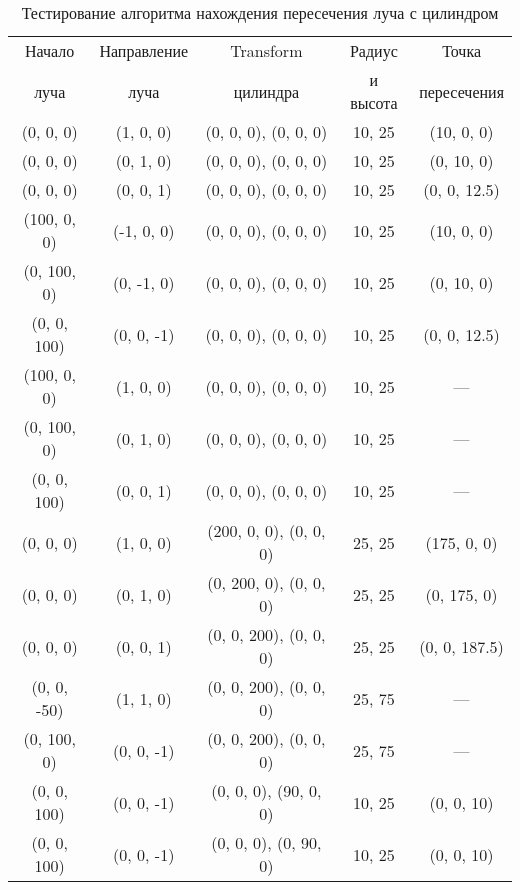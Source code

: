 \begin{table}[h]
	\begin{center}
		\begin{threeparttable}
			\captionsetup{justification=raggedright,singlelinecheck=off}
			\caption{Тестирование алгоритма нахождения пересечения луча с цилиндром}
			\label{tbl:test_cyl_hit}
			\begin{tabular}{|c|c|c|c|c|}
				\hline
				Начало  & Направление  & Transform  & Радиус & Точка \\
				луча &  луча &  цилиндра & и высота & пересечения \\
				\hline
				(0, 0, 0) & (1, 0, 0) & (0, 0, 0), (0, 0, 0) & 10, 25 & (10, 0, 0) \\
				\hline
				(0, 0, 0) & (0, 1, 0) & (0, 0, 0), (0, 0, 0) & 10, 25 & (0, 10, 0) \\
				\hline
				(0, 0, 0) & (0, 0, 1) & (0, 0, 0), (0, 0, 0) & 10, 25 & (0, 0, 12.5) \\
				\hline
				(100, 0, 0) & (-1, 0, 0) & (0, 0, 0), (0, 0, 0) & 10, 25 & (10, 0, 0) \\
				\hline
				(0, 100, 0) & (0, -1, 0) & (0, 0, 0), (0, 0, 0) & 10, 25 & (0, 10, 0) \\
				\hline
				(0, 0, 100) & (0, 0, -1) & (0, 0, 0), (0, 0, 0) & 10, 25 & (0, 0, 12.5) \\
				\hline
				(100, 0, 0) & (1, 0, 0) & (0, 0, 0), (0, 0, 0) & 10, 25 & --- \\
				\hline
				(0, 100, 0) & (0, 1, 0) & (0, 0, 0), (0, 0, 0) & 10, 25 & --- \\
				\hline
				(0, 0, 100) & (0, 0, 1) & (0, 0, 0), (0, 0, 0) & 10, 25 & --- \\
				\hline
				(0, 0, 0) & (1, 0, 0) & (200, 0, 0), (0, 0, 0) & 25, 25 & (175, 0, 0) \\
				\hline
				(0, 0, 0) & (0, 1, 0) & (0, 200, 0), (0, 0, 0) & 25, 25 & (0, 175, 0) \\
				\hline
				(0, 0, 0) & (0, 0, 1) & (0, 0, 200), (0, 0, 0) & 25, 25 & (0, 0, 187.5) \\
				\hline
				(0, 0, -50) & (1, 1, 0) & (0, 0, 200), (0, 0, 0) & 25, 75 & --- \\
				\hline
				(0, 100, 0) & (0, 0, -1) & (0, 0, 200), (0, 0, 0) & 25, 75 & --- \\
				\hline
				(0, 0, 100) & (0, 0, -1) & (0, 0, 0), (90, 0, 0) & 10, 25 & (0, 0, 10) \\
				\hline
				(0, 0, 100) & (0, 0, -1) & (0, 0, 0), (0, 90, 0) & 10, 25 & (0, 0, 10) \\

\end{tabular}
\end{threeparttable}
\end{center}
\end{table}
